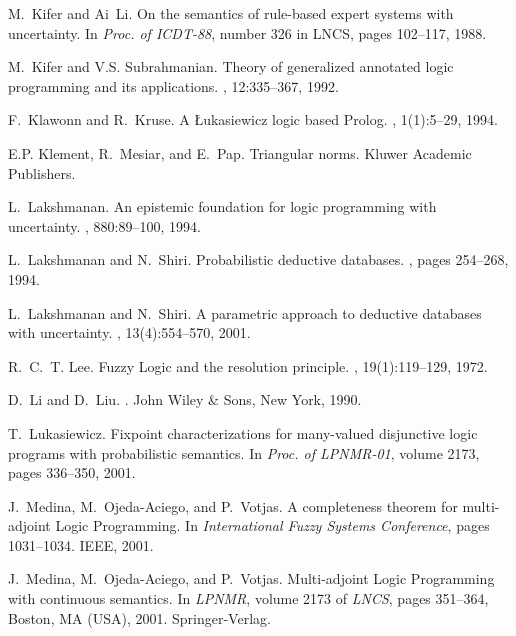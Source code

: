 \documentclass[runningheads,a4paper]{llncs}
\begin{document}
\begin{thebibliography}{10}
M.~Kifer and Ai~Li.
\newblock On the semantics of rule-based expert systems with uncertainty.
\newblock In {\em Proc. of ICDT-88}, number 326 in LNCS, pages 102--117, 1988.

M.~Kifer and V.S. Subrahmanian.
\newblock Theory of generalized annotated logic programming and its
  applications.
, 12:335--367, 1992.

F.~Klawonn and R.~Kruse.
\newblock A {{\L{}}}ukasiewicz logic based {P}rolog.
, 1(1):5--29, 1994.

E.P. Klement, R.~Mesiar, and E.~Pap.
\newblock Triangular norms.
\newblock Kluwer Academic Publishers.

L.~Lakshmanan.
\newblock An epistemic foundation for logic programming with uncertainty.
, 880:89--100, 1994.

L.~Lakshmanan and N.~Shiri.
\newblock Probabilistic deductive databases.
, pages 254--268, 1994.

L.~Lakshmanan and N.~Shiri.
\newblock A parametric approach to deductive databases with uncertainty.
,
  13(4):554--570, 2001.

R.~C.~T. Lee.
\newblock Fuzzy {L}ogic and the resolution principle.
,
  19(1):119--129, 1972.

D.~Li and D.~Liu.
.
\newblock John Wiley \& Sons, New York, 1990.

T.~Lukasiewicz.
\newblock Fixpoint characterizations for many-valued disjunctive logic programs
  with probabilistic semantics.
\newblock In {\em Proc. of LPNMR-01}, volume 2173, pages 336--350, 2001.

J.~Medina, M.~Ojeda-Aciego, and P.~Votjas.
\newblock A completeness theorem for multi-adjoint {L}ogic {P}rogramming.
\newblock In {\em International Fuzzy Systems Conference}, pages 1031--1034.
  IEEE, 2001.

J.~Medina, M.~Ojeda-Aciego, and P.~Votjas.
\newblock Multi-adjoint {L}ogic {P}rogramming with continuous semantics.
\newblock In {\em LPNMR}, volume 2173 of {\em LNCS}, pages 351--364, Boston, MA
  (USA), 2001. Springer-Verlag.


\end{thebibliography}
\end{document}
